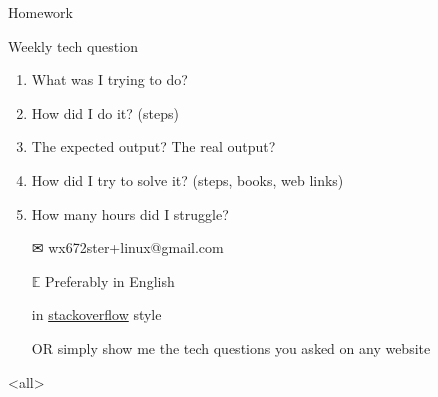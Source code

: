 \begin{frame}{{\hw\enspace}Homework}
  \begin{block}{Weekly tech question}
    \begin{enumerate}
    \item What was I trying to do?
    \item How did I do it? (steps)
    \item The expected output? The real output?
    \item How did I try to solve it? (steps, books, web links)
    \item How many hours did I struggle?
    \end{enumerate}
  \end{block}
  \begin{itemize}
  \item[\Large\dejavu ✉] \alert{\ttfamily wx672ster+linux@gmail.com}
  \item[$\mathbb{E}$] Preferably in English
  \item[\stackoverflow] in
    \href{https://stackoverflow.com/questions/39199299/what-is-the-essential-difference-between-compound-command-and-normal-command-inlink}{stackoverflow}
    style
  \item[OR] simply show me the tech questions you asked on any website
  \end{itemize}  
\end{frame}

\mode<all>
